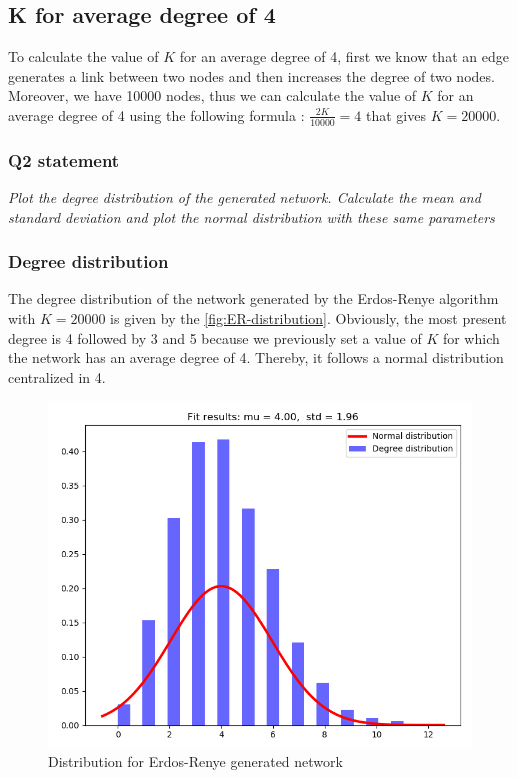 \documentclass{article}
\begin{document}
\subsection*{K for average degree of 4}

To calculate the value of $K$ for an average degree of 4, first we know that an edge generates a link between two nodes and then increases the degree of two nodes. Moreover, we have 10000 nodes, thus we can calculate the value of $K$ for an average degree of 4 using the following formula : $ \frac{2K}{10000} = 4 $ that gives $K = 20000$. 

\subsubsection{Q2 statement}

\textit{Plot the degree distribution of the generated network. Calculate the mean and standard deviation and plot the normal distribution with these same parameters}

\subsubsection*{Degree distribution} 
The degree distribution of the network generated by the Erdos-Renye algorithm with $K = 20000$ is given by the \autoref{fig:ER-distribution}. Obviously, the most present degree is 4 followed by 3 and 5 because we previously set a value of $K$ for which the network has an average degree of 4. Thereby, it follows a normal distribution centralized in 4. 

\begin{figure}[h]
  \centering
  \includegraphics[scale=0.6]{fig/ER-distribution.png}
  \caption{Distribution for Erdos-Renye generated network}
  \label{fig:ER-distribution}
\end{figure}
\end{document}
